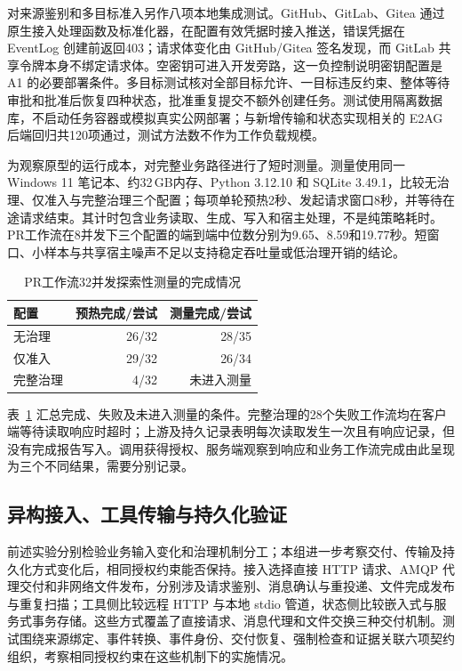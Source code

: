 对来源鉴别和多目标准入另作八项本地集成测试。GitHub、GitLab、Gitea 通过原生接入处理函数及标准化器，在配置有效凭据时接入推送，错误凭据在 EventLog 创建前返回403；请求体变化由 GitHub/Gitea 签名发现，而 GitLab 共享令牌本身不绑定请求体。空密钥可进入开发旁路，这一负控制说明密钥配置是 A1 的必要部署条件。多目标测试核对全部目标允许、一目标违反约束、整体等待审批和批准后恢复四种状态，批准重复提交不额外创建任务。测试使用隔离数据库，不启动任务容器或模拟真实公网部署；与新增传输和状态实现相关的 E2AG 后端回归共120项通过，测试方法数不作为工作负载规模。

为观察原型的运行成本，对完整业务路径进行了短时测量。测量使用同一 Windows 11 笔记本、约32\,GB内存、Python 3.12.10 和 SQLite 3.49.1，比较无治理、仅准入与完整治理三个配置；每项单轮预热2秒、发起请求窗口8秒，并等待在途请求结束。其计时包含业务读取、生成、写入和宿主处理，不是纯策略耗时。PR工作流在8并发下三个配置的端到端中位数分别为9.65、8.59和19.77秒。短窗口、小样本与共享宿主噪声不足以支持稳定吞吐量或低治理开销的结论。

\begin{table}[htbp]
\centering
\caption{PR工作流32并发探索性测量的完成情况}
\label{tab:exploratory-rr022}
\small
\begin{tabular}{lrr}
\toprule
配置 & 预热完成/尝试 & 测量完成/尝试 \\
\midrule
无治理 & 26/32 & 28/35 \\
仅准入 & 29/32 & 26/34 \\
完整治理 & 4/32 & 未进入测量 \\
\bottomrule
\end{tabular}
\end{table}

表~\ref{tab:exploratory-rr022} 汇总完成、失败及未进入测量的条件。完整治理的28个失败工作流均在客户端等待读取响应时超时；上游及持久记录表明每次读取发生一次且有响应记录，但没有完成报告写入。调用获得授权、服务端观察到响应和业务工作流完成由此呈现为三个不同结果，需要分别记录。

\subsection{异构接入、工具传输与持久化验证}
\label{sec:heterogeneity-rr022}

前述实验分别检验业务输入变化和治理机制分工；本组进一步考察交付、传输及持久化方式变化后，相同授权约束能否保持。接入选择直接 HTTP 请求、AMQP 代理交付和非网络文件发布，分别涉及请求鉴别、消息确认与重投递、文件完成发布与重复扫描；工具侧比较远程 HTTP 与本地 stdio 管道，状态侧比较嵌入式与服务式事务存储。这些方式覆盖了直接请求、消息代理和文件交换三种交付机制。测试围绕来源绑定、事件转换、事件身份、交付恢复、强制检查和证据关联六项契约组织，考察相同授权约束在这些机制下的实施情况。

